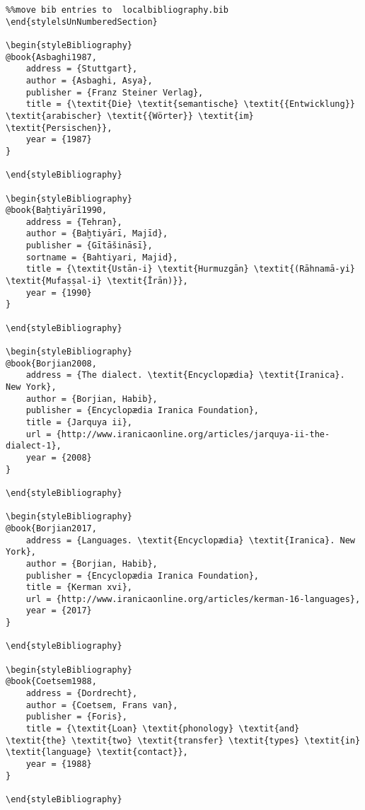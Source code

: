 \documentclass[output=paper]{langsci/langscibook}
\begin{document}
\begin{verbatim}%%move bib entries to  localbibliography.bib
\end{stylelsUnNumberedSection}

\begin{styleBibliography}
@book{Asbaghi1987,
	address = {Stuttgart},
	author = {Asbaghi, Asya},
	publisher = {Franz Steiner Verlag},
	title = {\textit{Die} \textit{semantische} \textit{{Entwicklung}} \textit{arabischer} \textit{{Wörter}} \textit{im} \textit{Persischen}},
	year = {1987}
}

\end{styleBibliography}

\begin{styleBibliography}
@book{Baḫtiyārī1990,
	address = {Tehran},
	author = {Baḫtiyārī, Majīd},
	publisher = {Gītāšināsī},
	sortname = {Bahtiyari, Majid},
	title = {\textit{Ustān-i} \textit{Hurmuzgān} \textit{(Rāhnamā-yi} \textit{Mufaṣṣal-i} \textit{Īrān)}},
	year = {1990}
}

\end{styleBibliography}

\begin{styleBibliography}
@book{Borjian2008,
	address = {The dialect. \textit{Encyclopædia} \textit{Iranica}. New York},
	author = {Borjian, Habib},
	publisher = {Encyclopædia Iranica Foundation},
	title = {Jarquya ii},
	url = {http://www.iranicaonline.org/articles/jarquya-ii-the-dialect-1},
	year = {2008}
}

\end{styleBibliography}

\begin{styleBibliography}
@book{Borjian2017,
	address = {Languages. \textit{Encyclopædia} \textit{Iranica}. New York},
	author = {Borjian, Habib},
	publisher = {Encyclopædia Iranica Foundation},
	title = {Kerman xvi},
	url = {http://www.iranicaonline.org/articles/kerman-16-languages},
	year = {2017}
}

\end{styleBibliography}

\begin{styleBibliography}
@book{Coetsem1988,
	address = {Dordrecht},
	author = {Coetsem, Frans van},
	publisher = {Foris},
	title = {\textit{Loan} \textit{phonology} \textit{and} \textit{the} \textit{two} \textit{transfer} \textit{types} \textit{in} \textit{language} \textit{contact}},
	year = {1988}
}

\end{styleBibliography}


\end{verbatim}
\end{document}
